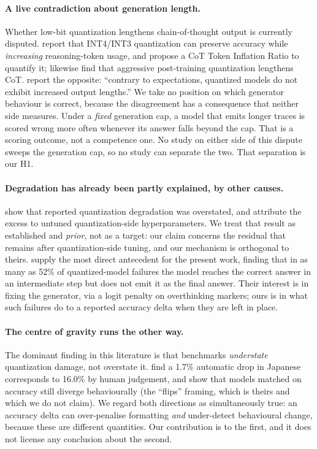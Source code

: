 \documentclass[conference]{IEEEtran}
\begin{document}
\paragraph{A live contradiction about generation length.}
Whether low-bit quantization lengthens chain-of-thought output is currently
disputed. \citet{lian2026inflates} report that INT4/INT3 quantization can
preserve accuracy while \emph{increasing} reasoning-token usage, and propose a
CoT Token Inflation Ratio to quantify it; \citet{lotfi2026longer} likewise find
that aggressive post-training quantization lengthens CoT. \citet{liu2025quantization}
report the opposite: ``contrary to expectations, quantized models do not exhibit
increased output lengths.'' We take no position on which generator behaviour is
correct, because the disagreement has a consequence that neither side measures.
Under a \emph{fixed} generation cap, a model that emits longer traces is scored
wrong more often whenever its answer falls beyond the cap. That is a scoring outcome,
not a competence one. No study on either side of this dispute sweeps the
generation cap, so no study can separate the two. That separation is our H1.

\paragraph{Degradation has already been partly explained, by other causes.}
\citet{kurtic2025bf16} show that reported quantization degradation was
overstated, and attribute the excess to untuned quantization-side
hyperparameters. We treat that result as established and \emph{prior}, not as a
target: our claim concerns the residual that remains after quantization-side
tuning, and our mechanism is orthogonal to theirs. \citet{lotfi2026longer}
supply the most direct antecedent for the present work, finding that in as many
as 52\% of quantized-model failures the model reaches the correct answer in an
intermediate step but does not emit it as the final answer. Their interest is in
fixing the generator, via a logit penalty on overthinking markers; ours is in
what such failures do to a reported accuracy delta when they are left in place.

\paragraph{The centre of gravity runs the other way.}
The dominant finding in this literature is that benchmarks \emph{understate}
quantization damage, not overstate it. \citet{marchisio2024multilingual} find a
1.7\% automatic drop in Japanese corresponds to 16.0\% by human judgement, and
\citet{dutta2024accuracy} show that models matched on accuracy still diverge
behaviourally (the ``flips'' framing, which is theirs and which we do not
claim). We regard both directions as simultaneously true: an accuracy delta can
over-penalise formatting \emph{and} under-detect behavioural change, because
these are different quantities. Our contribution is to the first, and it does
not license any conclusion about the second.
\end{document}
